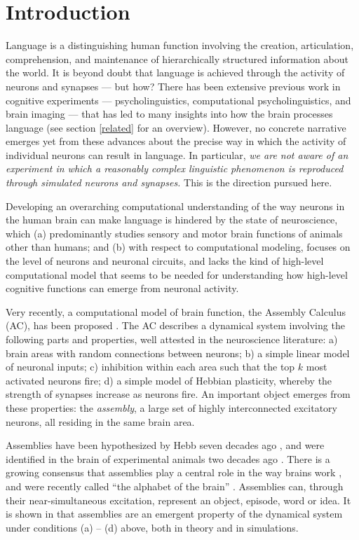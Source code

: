 \section{Introduction}
Language is a distinguishing human function involving the creation, articulation, comprehension, and maintenance of hierarchically structured information about the world. It is beyond doubt that language is achieved through the activity of neurons and synapses --- but how?  
There has been extensive previous work in cognitive experiments --- psycholinguistics, computational psycholinguistics, and brain imaging --- that has led to many insights into how the brain processes language (see section \ref{related} for an overview).
However, no concrete narrative emerges yet from these advances about the precise way in which the activity of individual neurons can result in language.  In particular, {\em we are not aware of an experiment in which a reasonably complex linguistic phenomenon is reproduced through simulated neurons and synapses.} This is the direction pursued here. 

Developing an overarching computational understanding of the way neurons in the human brain can make language is hindered by the state of neuroscience, which (a) predominantly studies sensory and motor brain functions of animals other than humans; and (b) with respect to computational modeling, focuses on the level of neurons and neuronal circuits, and lacks the kind of high-level computational model that seems to be needed for understanding how high-level cognitive functions can emerge from neuronal activity.

Very recently, a computational model of brain function, the Assembly Calculus (AC), has been proposed \cite{PNAS}.  The AC describes a dynamical system involving the following parts and properties, well attested in the neuroscience literature: a) brain areas with random connections between neurons; b) a simple linear model of neuronal inputs; c) inhibition within each area such that the top $k$ most activated neurons fire; d) a simple model of Hebbian plasticity, whereby the strength of synapses increase as neurons fire. 
An important object emerges from these properties: the {\em assembly}, a large set of highly interconnected excitatory neurons, all residing in the same brain area. 

Assemblies have been hypothesized by Hebb seven decades ago \cite{Hebb}, and were identified in the brain of experimental animals two decades ago \cite{Harris}. 
There is a growing consensus that assemblies play a central role in the way brains work \cite{Eichenbaum}, and were recently called ``the alphabet of the brain'' \cite{buzsakibook}. Assemblies can, through their near-simultaneous excitation, represent an object, episode, word or idea. It is shown in \citet{PNAS} that assemblies are an emergent property of the dynamical system under conditions (a) -- (d) above, both in theory and in simulations.   


